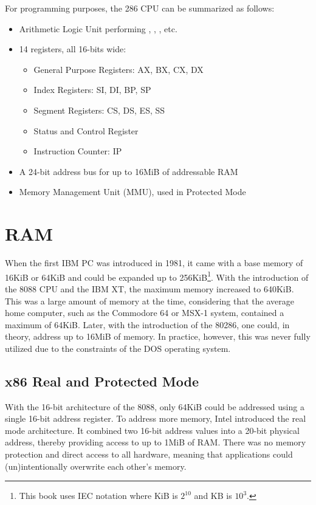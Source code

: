 \documentclass[book.tex]{subfiles}
\begin{document}
\par
For programming purposes, the 286 CPU can be summarized as follows:
\begin{itemize}
\item Arithmetic Logic Unit performing , , , etc.
\item 14 registers, all 16-bits wide:
\begin{itemize}
  \item General Purpose Registers: AX, BX, CX, DX
  \item Index Registers: SI, DI, BP, SP
  \item Segment Registers: CS, DS, ES, SS
  \item Status and Control Register
  \item Instruction Counter: IP
\end{itemize}
\item A 24-bit address bus for up to 16MiB of addressable RAM
\item Memory Management Unit (MMU), used in Protected Mode
\end{itemize}
 \par



\section{RAM}
When the first IBM PC was introduced in 1981, it came with a base memory of 16KiB or 64KiB and could be expanded up to 256KiB\footnote{This book uses IEC notation where KiB is $2^{10}$ and KB is $10^3$.}. With the introduction of the 8088 CPU and the IBM XT, the maximum memory increased to 640KiB. This was a large amount of memory at the time, considering that the average home computer, such as the Commodore 64 or MSX-1 system, contained a maximum of 64KiB. Later, with the introduction of the 80286, one could, in theory, address up to 16MiB of memory. In practice, however, this was never fully utilized due to the constraints of the DOS operating system.\\


\subsection{x86 Real and Protected Mode}
With the 16-bit architecture of the 8088, only 64KiB could be addressed using a single 16-bit address register. To address more memory, Intel introduced the real mode architecture. It combined two 16-bit address values into a 20-bit physical address, thereby providing access to up to 1MiB of RAM. There was no memory protection and direct access to all hardware, meaning that applications could (un)intentionally overwrite each other’s memory.\\
\end{document}
